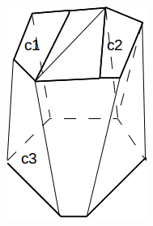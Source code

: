 \documentclass[3p,times]{elsarticle}
\begin{document}
\begin{figure}[ht]
\begin{subfigure}[b]{0.1\textwidth}
\includegraphics[width=\textwidth]{../picture/branch-hull.png}
\caption{}
\label{fig:branch-hull}
\end{subfigure}
~
\begin{subfigure}[b]{0.1\textwidth}

\end{subfigure}
\end{figure}
\end{document}

